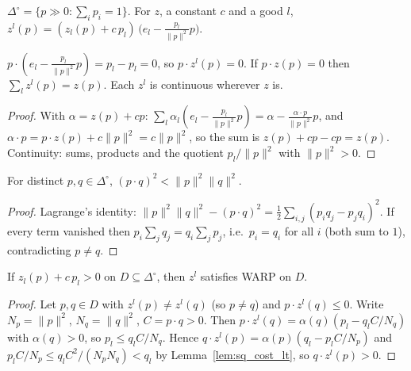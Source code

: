 \begin{definition}
\label{def:debreu_piece}
\leanok
$\Delta^\circ = \{p \gg 0 : \sum_i p_i = 1\}$. For $z$, a constant $c$ and a good $l$,
$z^l(p) = (z_l(p) + c\, p_l)\,\big(e_l - \tfrac{p_l}{\|p\|^2} p\big)$.
\end{definition}

\begin{lemma}
\label{lem:debreu_pieces}
\leanok
{}
$p \cdot (e_l - \frac{p_l}{\|p\|^2} p) = p_l - p_l = 0$, so $p \cdot z^l(p) = 0$. If $p \cdot z(p) = 0$ then
$\sum_l z^l(p) = z(p)$. Each $z^l$ is continuous wherever $z$ is.
\end{lemma}
\begin{proof}
\leanok
With $\alpha = z(p) + c p$: $\sum_l \alpha_l (e_l - \frac{p_l}{\|p\|^2} p) = \alpha - \frac{\alpha \cdot p}{\|p\|^2} p$, and
$\alpha \cdot p = p \cdot z(p) + c\|p\|^2 = c \|p\|^2$, so the sum is $z(p) + cp - cp = z(p)$. Continuity: sums, products
and the quotient $p_l / \|p\|^2$ with $\|p\|^2 > 0$.
\end{proof}

\begin{lemma}
\label{lem:sq_cost_lt}
\leanok
For distinct $p, q \in \Delta^\circ$, $(p \cdot q)^2 < \|p\|^2 \|q\|^2$.
\end{lemma}
\begin{proof}
\leanok
Lagrange's identity: $\|p\|^2\|q\|^2 - (p\cdot q)^2 = \tfrac12 \sum_{i,j} (p_i q_j - p_j q_i)^2$. If every term vanished then
$p_i \sum_j q_j = q_i \sum_j p_j$, i.e.\ $p_i = q_i$ for all $i$ (both sum to $1$), contradicting $p \ne q$.
\end{proof}

\begin{lemma}
\label{lem:debreu_warp}
\leanok
{}
If $z_l(p) + c\,p_l > 0$ on $D \subseteq \Delta^\circ$, then $z^l$ satisfies WARP on $D$.
\end{lemma}
\begin{proof}
\leanok
Let $p, q \in D$ with $z^l(p) \ne z^l(q)$ (so $p \ne q$) and $p \cdot z^l(q) \le 0$. Write $N_p = \|p\|^2$, $N_q = \|q\|^2$,
$C = p \cdot q > 0$. Then $p \cdot z^l(q) = \alpha(q)(p_l - q_l C / N_q)$ with $\alpha(q) > 0$, so $p_l \le q_l C/N_q$. Hence
$q \cdot z^l(p) = \alpha(p)(q_l - p_l C/N_p)$ and $p_l C / N_p \le q_l C^2/(N_p N_q) < q_l$ by Lemma~\ref{lem:sq_cost_lt}, so
$q \cdot z^l(p) > 0$.
\end{proof}

